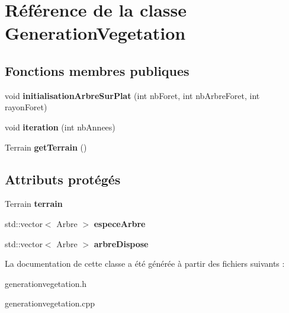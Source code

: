 \hypertarget{class_generation_vegetation}{}\section{Référence de la classe Generation\+Vegetation}
\label{class_generation_vegetation}
\subsection*{Fonctions membres publiques}
\begin{DoxyCompactItemize}
\item 
\hypertarget{class_generation_vegetation_aa046ccbd99caaeb6ccacb3cd47047af9}{}void {\bfseries initialisation\+Arbre\+Sur\+Plat} (int nb\+Foret, int nb\+Arbre\+Foret, int rayon\+Foret)\label{class_generation_vegetation_aa046ccbd99caaeb6ccacb3cd47047af9}

\item 
\hypertarget{class_generation_vegetation_a56f7a434b0e5f8a8d33a811197303629}{}void {\bfseries iteration} (int nb\+Annees)\label{class_generation_vegetation_a56f7a434b0e5f8a8d33a811197303629}

\item 
\hypertarget{class_generation_vegetation_a17415afb7f4e464574d6c63d2d219a1b}{}Terrain {\bfseries get\+Terrain} ()\label{class_generation_vegetation_a17415afb7f4e464574d6c63d2d219a1b}

\end{DoxyCompactItemize}
\subsection*{Attributs protégés}
\begin{DoxyCompactItemize}
\item 
\hypertarget{class_generation_vegetation_a54dd9a778140ffb12117794902bedb15}{}Terrain {\bfseries terrain}\label{class_generation_vegetation_a54dd9a778140ffb12117794902bedb15}

\item 
\hypertarget{class_generation_vegetation_a5506ebad1fd78f34f23760a054438024}{}std\+::vector$<$ Arbre $>$ {\bfseries espece\+Arbre}\label{class_generation_vegetation_a5506ebad1fd78f34f23760a054438024}

\item 
\hypertarget{class_generation_vegetation_a57c04aa74b6faa119784402f7bb0feee}{}std\+::vector$<$ Arbre $>$ {\bfseries arbre\+Dispose}\label{class_generation_vegetation_a57c04aa74b6faa119784402f7bb0feee}

\end{DoxyCompactItemize}


La documentation de cette classe a été générée à partir des fichiers suivants \+:\begin{DoxyCompactItemize}
\item 
generationvegetation.\+h\item 
generationvegetation.\+cpp\end{DoxyCompactItemize}
